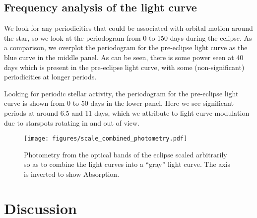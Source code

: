 \documentclass{aa}
\begin{document}
\subsection{Frequency analysis of the light curve}

%
%
We look for any periodicities that could be associated with orbital motion around the star, so we look at the periodogram from 0 to 150 days during the eclipse.
%
As a comparison, we overplot the periodogram for the pre-eclipse light curve as the blue curve in the middle panel. 
%
As can be seen, there is some power seen at 40 days which is present in the pre-eclipse light curve, with some (non-significant) periodicities at longer periods.

Looking for periodic stellar activity, the periodogram for the pre-eclipse light curve is shown from 0 to 50 days in the lower panel.
%
Here we see significant periods at around 6.5 and 11 days, which we attribute to light curve modulation due to starspots rotating in and out of view. 


\begin{figure*}
   \begin{centering}
   \texttt{[image: figures/scale\_combined\_photometry.pdf]}
      \caption{Photometry from the optical bands of the eclipse scaled arbitrarily so as to combine the light curves into a ``gray'' light curve.
      The axis is inverted to show Absorption.
              }
              \label{fig:allphot}
              \end{centering}
       \end{figure*}



\section{Discussion}\label{sec:discussion}
\end{document}
